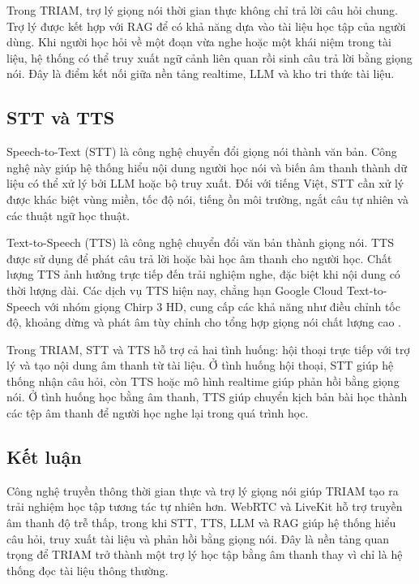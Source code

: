 \documentclass[12pt,a4paper]{report}
\begin{document}
Trong TRIAM, trợ lý giọng nói thời gian thực không chỉ trả lời câu hỏi chung. Trợ lý được kết hợp với RAG để có khả năng dựa vào tài liệu học tập của người dùng. Khi người học hỏi về một đoạn vừa nghe hoặc một khái niệm trong tài liệu, hệ thống có thể truy xuất ngữ cảnh liên quan rồi sinh câu trả lời bằng giọng nói. Đây là điểm kết nối giữa nền tảng realtime, LLM và kho tri thức tài liệu.

\subsection{STT và TTS}

Speech-to-Text (STT) là công nghệ chuyển đổi giọng nói thành văn bản. Công nghệ này giúp hệ thống hiểu nội dung người học nói và biến âm thanh thành dữ liệu có thể xử lý bởi LLM hoặc bộ truy xuất. Đối với tiếng Việt, STT cần xử lý được khác biệt vùng miền, tốc độ nói, tiếng ồn môi trường, ngắt câu tự nhiên và các thuật ngữ học thuật.

Text-to-Speech (TTS) là công nghệ chuyển đổi văn bản thành giọng nói. TTS được sử dụng để phát câu trả lời hoặc bài học âm thanh cho người học. Chất lượng TTS ảnh hưởng trực tiếp đến trải nghiệm nghe, đặc biệt khi nội dung có thời lượng dài. Các dịch vụ TTS hiện nay, chẳng hạn Google Cloud Text-to-Speech với nhóm giọng Chirp 3 HD, cung cấp các khả năng như điều chỉnh tốc độ, khoảng dừng và phát âm tùy chỉnh cho tổng hợp giọng nói chất lượng cao \cite{googleCloudTtsDocs}.

Trong TRIAM, STT và TTS hỗ trợ cả hai tình huống: hội thoại trực tiếp với trợ lý và tạo nội dung âm thanh từ tài liệu. Ở tình huống hội thoại, STT giúp hệ thống nhận câu hỏi, còn TTS hoặc mô hình realtime giúp phản hồi bằng giọng nói. Ở tình huống học bằng âm thanh, TTS giúp chuyển kịch bản bài học thành các tệp âm thanh để người học nghe lại trong quá trình học.

\subsection{Kết luận}

Công nghệ truyền thông thời gian thực và trợ lý giọng nói giúp TRIAM tạo ra trải nghiệm học tập tương tác tự nhiên hơn. WebRTC và LiveKit hỗ trợ truyền âm thanh độ trễ thấp, trong khi STT, TTS, LLM và RAG giúp hệ thống hiểu câu hỏi, truy xuất tài liệu và phản hồi bằng giọng nói. Đây là nền tảng quan trọng để TRIAM trở thành một trợ lý học tập bằng âm thanh thay vì chỉ là hệ thống đọc tài liệu thông thường.
\end{document}
